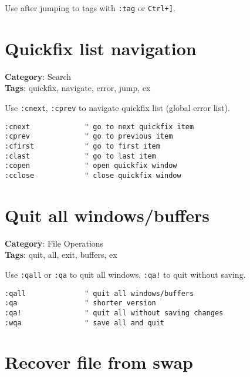 {{{{{Use after jumping to tags with {\footnotesize \Verb§:tag§} or {\footnotesize \Verb§Ctrl+]§}.

\section{Quickfix list navigation}

\textbf{Category}: Search\\ \textbf{Tags}: quickfix, navigate, error, jump, ex
\vspace{0.5cm}

Use {\footnotesize \Verb§:cnext§}, {\footnotesize \Verb§:cprev§} to navigate quickfix list (global error list).

\begin{Exa*}{}
\begin{Verbatim}[fontsize=\footnotesize, breaklines, breakanywhere]
:cnext             " go to next quickfix item
:cprev             " go to previous item  
:cfirst            " go to first item
:clast             " go to last item
:copen             " open quickfix window
:cclose            " close quickfix window
\end{Verbatim}
\end{Exa*}

\section{Quit all windows/buffers}

\textbf{Category}: File Operations\\ \textbf{Tags}: quit, all, exit, buffers, ex
\vspace{0.5cm}

Use {\footnotesize \Verb§:qall§} or {\footnotesize \Verb§:qa§} to quit all windows, {\footnotesize \Verb§:qa!§} to quit without saving.

\begin{Exa*}{}
\begin{Verbatim}[fontsize=\footnotesize, breaklines, breakanywhere]
:qall              " quit all windows/buffers
:qa                " shorter version
:qa!               " quit all without saving changes
:wqa               " save all and quit
\end{Verbatim}
\end{Exa*}

\section{Recover file from swap}

}}}}}
